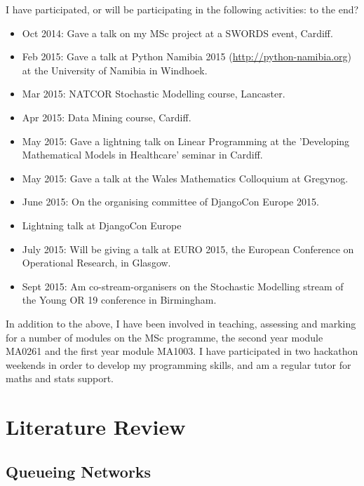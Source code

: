 \documentclass{article}
\begin{document}
I have participated, or will be participating in the following activities: %
to the end?
\begin{itemize}
    \item Oct 2014: Gave a talk on my MSc project at a SWORDS event, Cardiff.
    \item Feb 2015: Gave a talk at Python Namibia 2015
        (\url{http://python-namibia.org}) at the University of Namibia in Windhoek.
    \item Mar 2015: NATCOR Stochastic Modelling course, Lancaster.
    \item Apr 2015: Data Mining course, Cardiff.
    \item May 2015: Gave a lightning talk on Linear Programming at the
        'Developing Mathematical Models in Healthcare' seminar in Cardiff. %
    \item May 2015: Gave a talk at the Wales Mathematics Colloquium at Gregynog.
    \item June 2015: On the organising committee of DjangoCon Europe 2015. %
    \item Lightning talk at DjangoCon Europe %
    \item July 2015: Will be giving a talk at EURO 2015, the European Conference
        on Operational Research, in Glasgow. %
    \item Sept 2015: Am co-stream-organisers on the Stochastic Modelling stream
        of the Young OR 19 conference in Birmingham. %
\end{itemize}

In addition to the above, I have been involved in teaching, assessing and
marking for a number of modules on the MSc programme, the second year module
MA0261 and the first year module MA1003. %
I have participated in two hackathon weekends in order to develop my programming skills, and am a regular tutor for maths and stats support.


\section{Literature Review}


\subsection{Queueing Networks}
\end{document}
